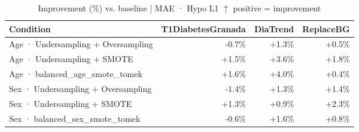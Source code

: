 \begin{table}[htbp]
\centering
\small
\caption{Improvement (\%) vs. baseline  |  MAE · Hypo L1  $\uparrow$ positive = improvement}
\label{tab:delta_mae_tbr_1_family_size_same_size}
\begin{tabular}{lrrr}
\toprule
\textbf{Condition} & \textbf{T1DiabetesGranada} & \textbf{DiaTrend} & \textbf{ReplaceBG} \\
\midrule
Age · Undersampling + Oversampling & \textcolor{BrickRed}{-0.7\%} & \textcolor{OliveGreen}{+1.3\%} & \textcolor{OliveGreen}{+0.5\%} \\
Age · Undersampling + SMOTE & \textcolor{OliveGreen}{+1.5\%} & \textcolor{OliveGreen}{+3.6\%} & \textcolor{OliveGreen}{+1.8\%} \\
Age · balanced_age_smote_tomek & \textcolor{OliveGreen}{+1.6\%} & \textcolor{OliveGreen}{+4.0\%} & \textcolor{OliveGreen}{+0.4\%} \\
\midrule
Sex · Undersampling + Oversampling & \textcolor{BrickRed}{-1.4\%} & \textcolor{OliveGreen}{+1.3\%} & \textcolor{OliveGreen}{+1.4\%} \\
Sex · Undersampling + SMOTE & \textcolor{OliveGreen}{+1.3\%} & \textcolor{OliveGreen}{+0.9\%} & \textcolor{OliveGreen}{+2.3\%} \\
Sex · balanced_sex_smote_tomek & \textcolor{BrickRed}{-0.6\%} & \textcolor{OliveGreen}{+1.6\%} & \textcolor{OliveGreen}{+0.8\%} \\
\bottomrule
\end{tabular}
\end{table}